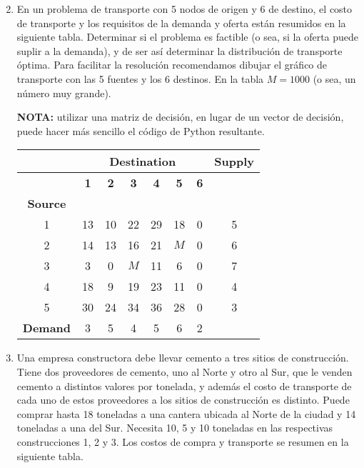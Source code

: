 \documentclass{article}
\begin{document}
\begin{enumerate}
    \setcounter{enumi}{1} %
    \item En un problema de transporte con 5 nodos de origen y 6 de destino, el costo de transporte y los requisitos de la demanda y oferta están resumidos en la siguiente tabla.  
    Determinar si el problema es factible (o sea, si la oferta puede suplir a la demanda), y de ser así determinar la distribución de transporte óptima.  
    Para facilitar la resolución recomendamos dibujar el gráfico de transporte con las 5 fuentes y los 6 destinos.  
    En la tabla \(M = 1000\) (o sea, un número muy grande).  

    \textbf{NOTA:} utilizar una matriz de decisión, en lugar de un vector de decisión, puede hacer más sencillo el código de Python resultante.

    \begin{table}[h]
        \centering
        \renewcommand{\arraystretch}{1.3} %
        \begin{tabular}{c|cccccc|c}
            \hline
            & \multicolumn{6}{c|}{\textbf{Destination}} & \textbf{Supply} \\
            \hline
            & \textbf{1} & \textbf{2} & \textbf{3} & \textbf{4} & \textbf{5} & \textbf{6} &  \\
            \hline
            \textbf{Source} & & & & & & & \\
            1 & 13 & 10 & 22 & 29 & 18 & 0 & 5 \\
            2 & 14 & 13 & 16 & 21 & $M$ & 0 & 6 \\
            3 & 3 & 0 & $M$ & 11 & 6 & 0 & 7 \\
            4 & 18 & 9 & 19 & 23 & 11 & 0 & 4 \\
            5 & 30 & 24 & 34 & 36 & 28 & 0 & 3 \\
            \hline
            \textbf{Demand} & 3 & 5 & 4 & 5 & 6 & 2 & \\
            \hline
        \end{tabular}
    \end{table}
    
    \item Una empresa constructora debe llevar cemento a tres sitios de construcción. Tiene dos proveedores de cemento, uno al Norte y otro al Sur, que le venden cemento a distintos valores por tonelada, y además el costo de transporte de cada uno de estos proveedores a los sitios de construcción es distinto. Puede comprar hasta 18 toneladas a una cantera ubicada al Norte de la ciudad y 14 toneladas a una del Sur.  
    Necesita 10, 5 y 10 toneladas en las respectivas construcciones 1, 2 y 3.  
    Los costos de compra y transporte se resumen en la siguiente tabla.  


\end{enumerate}
\end{document}
